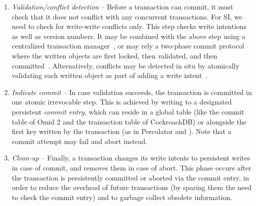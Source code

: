 \begin{enumerate}
   \item \emph{Validation/conflict detection} -- Before a transaction can commit, it must check that it does not conflict with any 
  concurrent transactions.  For SI, we need to check for write-write conflicts only. 
  This step checks write intentions as well as version numbers. It may be combined  with the above step using a centralized 
  transaction manager~\cite{OmidICDE2014,tephra,omid-blog}, or may rely a two-phase commit protocol where the written objects are first 
  locked, then validated, and then committed~\cite{Percolator2010}. 
 Alternatively, conflicts may be detected in situ by atomically validating each written object as part of adding a write  intent~\cite{cockroach}.
  \item \emph{Indicate commit} --  In case validation succeeds, the transaction is committed 
  in one atomic irrevocable  step. This is achieved by writing to a designated persistent \emph{commit entry}, 
  which can reside in a global table (like the commit table of 
  Omid 2 and the transaction table of CockroachDB) or alongside the first  key written by 
  the transaction (as in Percolator and \sys).  Note that a commit attempt may fail and abort instead. 
  \item \emph{Clean-up} -- Finally, a transaction changes its write intents to
  persistent writes in case of commit, and removes them in case of abort. This
  phase occurs after the transaction is persistently committed or aborted via the commit entry, in
  order to reduce the overhead of future transactions (by sparing them the need to check the commit entry)
  and to garbage collect   obsolete information. 
\end{enumerate}

 